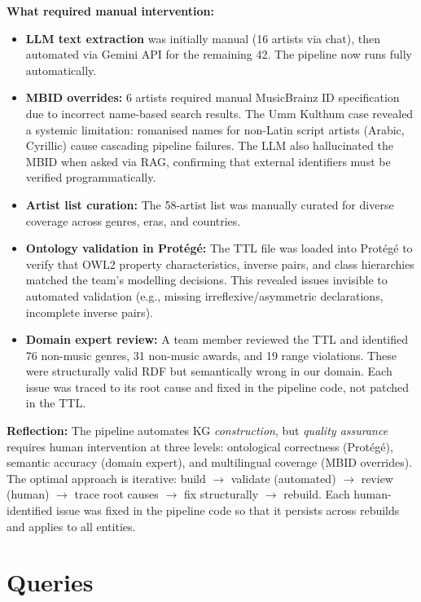 \documentclass[11pt,a4paper]{article}
\begin{document}
\textbf{What required manual intervention:}

\begin{itemize}
  \item \textbf{LLM text extraction} was initially manual (16 artists via chat), then automated via Gemini API for the remaining 42. The pipeline now runs fully automatically.
  \item \textbf{MBID overrides:} 6 artists required manual MusicBrainz ID specification due to incorrect name-based search results. The Umm Kulthum case revealed a systemic limitation: romanised names for non-Latin script artists (Arabic, Cyrillic) cause cascading pipeline failures. The LLM also hallucinated the MBID when asked via RAG, confirming that external identifiers must be verified programmatically.
  \item \textbf{Artist list curation:} The 58-artist list was manually curated for diverse coverage across genres, eras, and countries.
  \item \textbf{Ontology validation in Prot\'{e}g\'{e}:} The TTL file was loaded into Prot\'{e}g\'{e} to verify that OWL2 property characteristics, inverse pairs, and class hierarchies matched the team's modelling decisions. This revealed issues invisible to automated validation (e.g., missing irreflexive/asymmetric declarations, incomplete inverse pairs).
  \item \textbf{Domain expert review:} A team member reviewed the TTL and identified 76 non-music genres, 31 non-music awards, and 19 range violations. These were structurally valid RDF but semantically wrong in our domain. Each issue was traced to its root cause and fixed in the pipeline code, not patched in the TTL.
\end{itemize}

\textbf{Reflection:} The pipeline automates KG \textit{construction}, but \textit{quality assurance} requires human intervention at three levels: ontological correctness (Prot\'{e}g\'{e}), semantic accuracy (domain expert), and multilingual coverage (MBID overrides). The optimal approach is iterative: build $\rightarrow$ validate (automated) $\rightarrow$ review (human) $\rightarrow$ trace root causes $\rightarrow$ fix structurally $\rightarrow$ rebuild. Each human-identified issue was fixed in the pipeline code so that it persists across rebuilds and applies to all entities.


\section{Queries}
\end{document}
